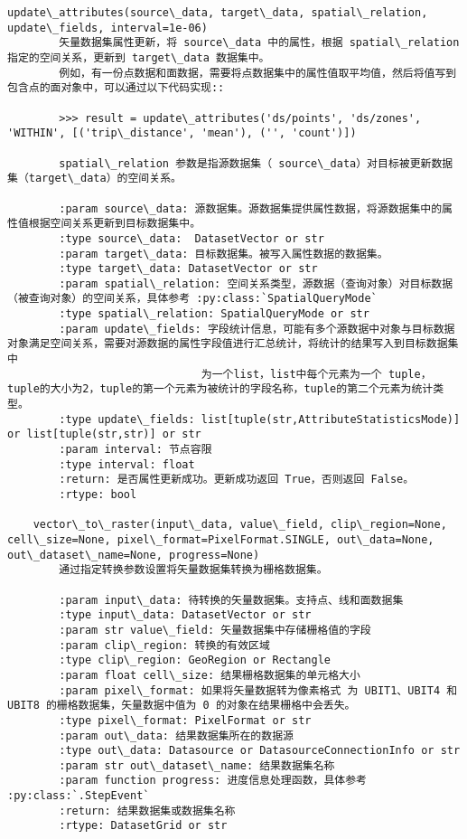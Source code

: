 \documentclass[11pt]{article}
\begin{document}
\begin{Verbatim}[commandchars=\\\{\}]
    update\_attributes(source\_data, target\_data, spatial\_relation, update\_fields, interval=1e-06)
        矢量数据集属性更新，将 source\_data 中的属性，根据 spatial\_relation 指定的空间关系，更新到 target\_data 数据集中。
        例如，有一份点数据和面数据，需要将点数据集中的属性值取平均值，然后将值写到包含点的面对象中，可以通过以下代码实现::
        
        >>> result = update\_attributes('ds/points', 'ds/zones', 'WITHIN', [('trip\_distance', 'mean'), ('', 'count')])
        
        spatial\_relation 参数是指源数据集（ source\_data）对目标被更新数据集（target\_data）的空间关系。
        
        :param source\_data: 源数据集。源数据集提供属性数据，将源数据集中的属性值根据空间关系更新到目标数据集中。
        :type source\_data:  DatasetVector or str
        :param target\_data: 目标数据集。被写入属性数据的数据集。
        :type target\_data: DatasetVector or str
        :param spatial\_relation: 空间关系类型，源数据（查询对象）对目标数据（被查询对象）的空间关系，具体参考 :py:class:`SpatialQueryMode`
        :type spatial\_relation: SpatialQueryMode or str
        :param update\_fields: 字段统计信息，可能有多个源数据中对象与目标数据对象满足空间关系，需要对源数据的属性字段值进行汇总统计，将统计的结果写入到目标数据集中
                              为一个list，list中每个元素为一个 tuple，tuple的大小为2，tuple的第一个元素为被统计的字段名称，tuple的第二个元素为统计类型。
        :type update\_fields: list[tuple(str,AttributeStatisticsMode)] or list[tuple(str,str)] or str
        :param interval: 节点容限
        :type interval: float
        :return: 是否属性更新成功。更新成功返回 True，否则返回 False。
        :rtype: bool
    
    vector\_to\_raster(input\_data, value\_field, clip\_region=None, cell\_size=None, pixel\_format=PixelFormat.SINGLE, out\_data=None, out\_dataset\_name=None, progress=None)
        通过指定转换参数设置将矢量数据集转换为栅格数据集。
        
        :param input\_data: 待转换的矢量数据集。支持点、线和面数据集
        :type input\_data: DatasetVector or str
        :param str value\_field: 矢量数据集中存储栅格值的字段
        :param clip\_region: 转换的有效区域
        :type clip\_region: GeoRegion or Rectangle
        :param float cell\_size: 结果栅格数据集的单元格大小
        :param pixel\_format: 如果将矢量数据转为像素格式 为 UBIT1、UBIT4 和 UBIT8 的栅格数据集，矢量数据中值为 0 的对象在结果栅格中会丢失。
        :type pixel\_format: PixelFormat or str
        :param out\_data: 结果数据集所在的数据源
        :type out\_data: Datasource or DatasourceConnectionInfo or str
        :param str out\_dataset\_name: 结果数据集名称
        :param function progress: 进度信息处理函数，具体参考 :py:class:`.StepEvent`
        :return: 结果数据集或数据集名称
        :rtype: DatasetGrid or str
    

\end{Verbatim}
\end{document}
